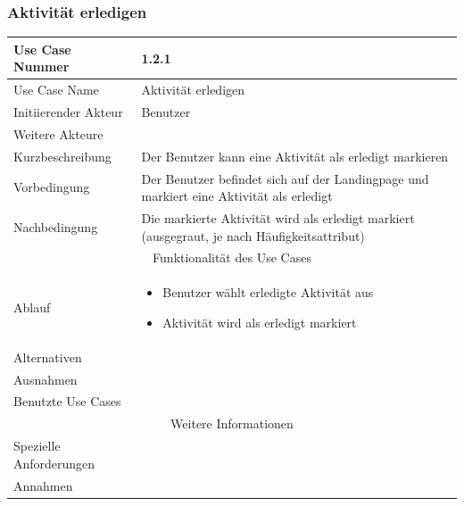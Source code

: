 \documentclass[10pt,a4paper]{article}
\begin{document}
		\subsubsection{Aktivität erledigen}
		\begin{tabular}{|l|p{.5\linewidth}|}
			\hline Use Case Nummer & 1.2.1 \\ 
			\hline Use Case Name & Aktivität erledigen \\ 
			\hline Initiierender Akteur & Benutzer \\
			\hline Weitere Akteure & \\
			\hline Kurzbeschreibung & Der Benutzer kann eine Aktivität als erledigt markieren \\
			\hline Vorbedingung & Der Benutzer befindet sich auf der Landingpage und markiert eine Aktivität als erledigt \\
			\hline Nachbedingung & Die markierte Aktivität wird als erledigt markiert (ausgegraut, je nach Häufigkeitsattribut) \\
			\hline \multicolumn{2}{|c|}{Funktionalität des Use Cases}\\
			\hline Ablauf & \begin{itemize}
				\item Benutzer wählt erledigte Aktivität aus
				\item Aktivität wird als erledigt markiert
			\end{itemize} \\
			\hline Alternativen & \\
			\hline Ausnahmen & \\
			\hline Benutzte Use Cases & \\
			\hline \multicolumn{2}{|c|}{Weitere Informationen} \\
			\hline Spezielle Anforderungen & \\
			\hline Annahmen & \\
			\hline
		\end{tabular}
		
\end{document}
